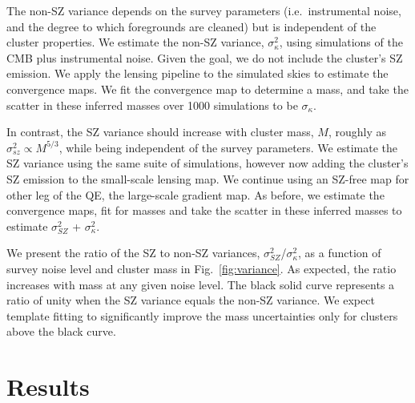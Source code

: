 The non-SZ variance depends on the survey parameters (i.e.~instrumental noise, and the degree to which foregrounds are cleaned) but is independent of the cluster properties. 
We estimate the non-SZ variance, $\sigma_{\kappa}^{2}$, using simulations of the CMB plus instrumental noise. 
Given the goal, we do not include the cluster's SZ emission.  
We apply the lensing pipeline to the simulated skies to estimate the convergence maps. 
We fit the convergence map  to determine  a mass, and take the scatter in these inferred masses over 1000 simulations to be $\sigma_{\kappa}$. 


In contrast, the SZ variance should increase with cluster mass, $M$, roughly as $\sigma_{sz}^2 \propto M^{5/3}$, while being independent of the survey parameters. 
We estimate the SZ variance using the same suite of simulations, however now adding the cluster's SZ emission to the small-scale lensing map. 
We continue using an SZ-free map for other leg of the QE, the large-scale gradient map. 
As before, we estimate the convergence maps, fit for masses and take the scatter in these inferred masses to estimate $\sigma_{SZ}^{2}$ + $\sigma_{\kappa}^{2}$.

We present the ratio of the SZ to non-SZ variances, $\sigma_{SZ}^{2}$/$\sigma_{\kappa}^{2}$, as a function of survey noise level and cluster mass in Fig.~\ref{fig:variance}.  
As expected, the ratio increases with mass at any given noise level. 
The black solid curve represents a ratio of unity when the SZ variance equals the non-SZ variance. 
We expect template fitting to significantly improve the mass uncertainties only for clusters above the black curve. 

\section{Results}
\label{sec_results}




